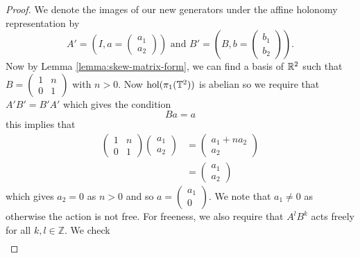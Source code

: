 \begin{proof}
    We denote the images of our new generators under the affine holonomy
    representation by $$A' = \left( I, a =\begin{pmatrix}
                a_1 \\ a_2
            \end{pmatrix} \right) \text{ and } B' = \left( B, b =\begin{pmatrix}
                b_1 \\ b_2
            \end{pmatrix} \right).$$
    Now by Lemma \ref{lemma:skew-matrix-form}, we can find a basis of $\mathbb{R}^2$ such
    that $B = \begin{pmatrix}
            1 & n \\
            0 & 1
        \end{pmatrix}$ with $n>0$. Now $\text{hol}(\pi_1(\mathbb{T}^2))$ is abelian so we require that $A'B'= B'A'$ which gives the condition
    $$
        Ba = a
    $$
    this implies that
    \begin{align*}
        \begin{pmatrix}
            1 & n \\
            0 & 1
        \end{pmatrix}\begin{pmatrix}
                         a_1 \\ a_2
                     \end{pmatrix} & = \begin{pmatrix}
                                           a_1 + na_2 \\
                                           a_2
                                       \end{pmatrix}   \\
                                     & = \begin{pmatrix}
                                             a_1 \\
                                             a_2
                                         \end{pmatrix}
    \end{align*}
    which gives $a_2=0$ as $n>0$ and so $a = \begin{pmatrix}
            a_1 \\
            0
        \end{pmatrix}$. We note that $a_1 \neq 0$ as otherwise the action is not free. For freeness, we also require that $A^lB^k$ acts freely for all $k,l \in \mathbb{Z}$. We check
    \begin{align*}

\end{align*}
\end{proof}
